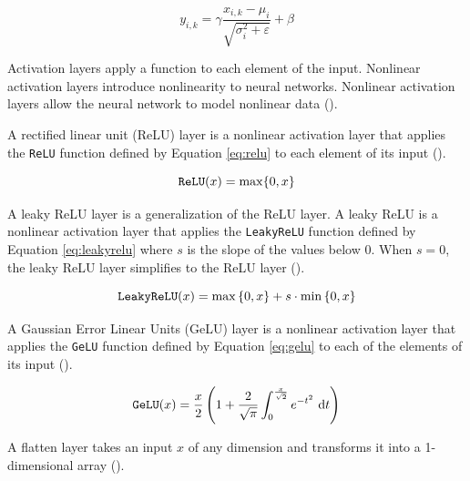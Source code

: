 \begin{equation}
    y_{i,k} = \gamma \frac{x_{i,k} - \mu_i}{\sqrt{\sigma^2_i + \varepsilon}} + \beta
    \label{eq:layernorm}
\end{equation}

Activation layers apply a function to each element of the input. Nonlinear activation layers introduce nonlinearity to neural networks. Nonlinear activation layers allow the neural network to model nonlinear data (\cite{activation}).

A rectified linear unit (ReLU) layer is a nonlinear activation layer that applies the \verb|ReLU| function defined by Equation \ref{eq:relu} to each element of its input (\cite{activation}). 

\begin{equation}
    \verb|ReLU|(x) =  \max\{0, x\}
    \label{eq:relu}
\end{equation}

A leaky ReLU layer is a generalization of the ReLU layer. A leaky ReLU is a nonlinear activation layer that applies the \verb|LeakyReLU| function defined by Equation \ref{eq:leakyrelu} where $s$ is the slope of the values below $0$. When $s=0$, the leaky ReLU layer simplifies to the ReLU layer (\cite{activation}).

\begin{equation}
    \verb|LeakyReLU|(x) = \max{\{0, x\}} + s \cdot \min{\{0, x\}}
    \label{eq:leakyrelu}
\end{equation}

A Gaussian Error Linear Units (GeLU) layer is a nonlinear activation layer that applies the \verb|GeLU| function defined by Equation \ref{eq:gelu} to each of the elements of its input (\cite{hendrycks2016gaussian}). 

\begin{equation}
    \verb|GeLU|(x) =  \frac{x}{2}\left(1+\frac{2}{\sqrt{\pi}}\int_0^{\frac{x}{\sqrt{2}}}e^{-t^2}~\text{d}t\right)
    \label{eq:gelu}
\end{equation}

A flatten layer takes an input $x$ of any dimension and transforms it into a 1-dimensional array (\cite{wilamowski2009neural}).



